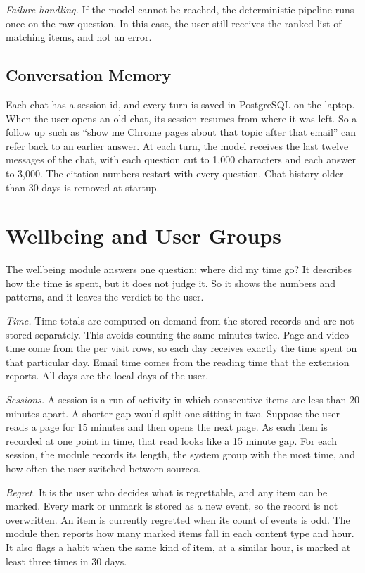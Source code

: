 \documentclass[conference]{IEEEtran}
\begin{document}
\textit{Failure handling.} If the model cannot be reached, the deterministic pipeline runs once on the raw question. In this case, the user still receives the ranked list of matching items, and not an error.

\subsection{Conversation Memory}
Each chat has a session id, and every turn is saved in PostgreSQL on the laptop. When the user opens an old chat, its session resumes from where it was left. So a follow up such as ``show me Chrome pages about that topic after that email'' can refer back to an earlier answer. At each turn, the model receives the last twelve messages of the chat, with each question cut to 1,000 characters and each answer to 3,000. The citation numbers restart with every question. Chat history older than 30 days is removed at startup.

\section{Wellbeing and User Groups}\label{sec:wba}
The wellbeing module answers one question: where did my time go? It describes how the time is spent, but it does not judge it. So it shows the numbers and patterns, and it leaves the verdict to the user.

\textit{Time.} Time totals are computed on demand from the stored records and are not stored separately. This avoids counting the same minutes twice. Page and video time come from the per visit rows, so each day receives exactly the time spent on that particular day. Email time comes from the reading time that the extension reports. All days are the local days of the user.

\textit{Sessions.} A session is a run of activity in which consecutive items are less than 20 minutes apart. A shorter gap would split one sitting in two. Suppose the user reads a page for 15 minutes and then opens the next page. As each item is recorded at one point in time, that read looks like a 15 minute gap. For each session, the module records its length, the system group with the most time, and how often the user switched between sources.

\textit{Regret.} It is the user who decides what is regrettable, and any item can be marked. Every mark or unmark is stored as a new event, so the record is not overwritten. An item is currently regretted when its count of events is odd. The module then reports how many marked items fall in each content type and hour. It also flags a habit when the same kind of item, at a similar hour, is marked at least three times in 30 days.
\end{document}
